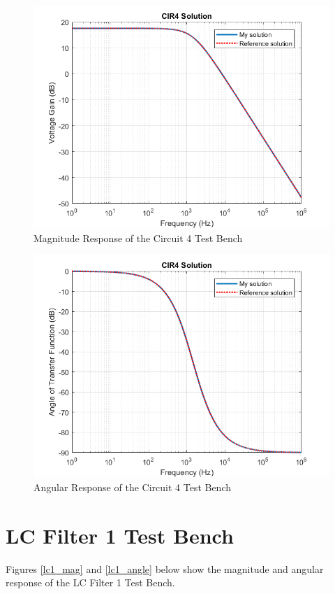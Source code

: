 \documentclass[a4paper,titlepage]{article}
\begin{document}
		\begin{figure}[H]
			\centering
			\includegraphics[width=0.7\linewidth]{../../src/a3/plots/cir4_gain}
			\caption{Magnitude Response of the Circuit 4 Test Bench}
			\label{cir4_mag}
		\end{figure}
		\begin{figure}[H]
			\centering
			\includegraphics[width=0.7\linewidth]{../../src/a3/plots/cir4_angle}
			\caption{Angular Response of the Circuit 4 Test Bench}
			\label{cir4_angle}
		\end{figure}
		
		\newpage
		\section{LC Filter 1 Test Bench}
		Figures \ref{lc1_mag} and \ref{lc1_angle} below show the magnitude and angular response of the LC Filter 1 Test Bench. 
		
\end{document}
